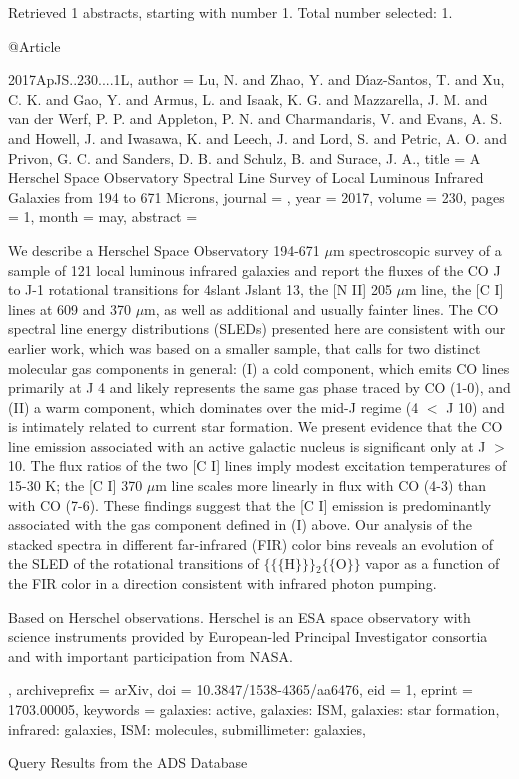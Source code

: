 \documentclass[longauth]{aa}
\begin{document}
{{{{{{{Retrieved 1 abstracts, starting with number 1.  Total number selected: 1.

@Article{2017ApJS..230....1L,
  author        = {Lu, N. and Zhao, Y. and D{\'{\i}}az-Santos, T. and Xu, C. K. and Gao, Y. and Armus, L. and Isaak, K. G. and Mazzarella, J. M. and van der Werf, P. P. and Appleton, P. N. and Charmandaris, V. and Evans, A. S. and Howell, J. and Iwasawa, K. and Leech, J. and Lord, S. and Petric, A. O. and Privon, G. C. and Sanders, D. B. and Schulz, B. and Surace, J. A.},
  title         = {A Herschel Space Observatory Spectral Line Survey of Local Luminous Infrared Galaxies from 194 to 671 Microns},
  journal       = {\apjs},
  year          = {2017},
  volume        = {230},
  pages         = {1},
  month         = may,
  abstract      = {We describe a Herschel Space Observatory 194-671 {$\mu$}m spectroscopic
survey of a sample of 121 local luminous infrared galaxies and report
the fluxes of the CO J to J-1 rotational transitions for 4{\le}slant
J{\le}slant 13, the [N II] 205 {$\mu$}m line, the [C I] lines at 609 and 370
{$\mu$}m, as well as additional and usually fainter lines. The CO spectral
line energy distributions (SLEDs) presented here are consistent with our
earlier work, which was based on a smaller sample, that calls for two
distinct molecular gas components in general: (I) a cold component,
which emits CO lines primarily at J {\lsim} 4 and likely represents the
same gas phase traced by CO (1-0), and (II) a warm component, which
dominates over the mid-J regime (4 $\lt$ J {\lsim} 10) and is intimately
related to current star formation. We present evidence that the CO line
emission associated with an active galactic nucleus is significant only
at J $\gt$ 10. The flux ratios of the two [C I] lines imply modest
excitation temperatures of 15-30 K; the [C I] 370 {$\mu$}m line scales more
linearly in flux with CO (4-3) than with CO (7-6). These findings
suggest that the [C I] emission is predominantly associated with the gas
component defined in (I) above. Our analysis of the stacked spectra in
different far-infrared (FIR) color bins reveals an evolution of the SLED
of the rotational transitions of $\{$$\{$$\{$H$\}$$\}$$\}$$_{2}$$\{$$\{$O$\}$$\}$ vapor as a
function of the FIR color in a direction consistent with infrared photon
pumping.

Based on Herschel observations. Herschel is an ESA space observatory
with science instruments provided by European-led Principal Investigator
consortia and with important participation from NASA.
},
  archiveprefix = {arXiv},
  doi           = {10.3847/1538-4365/aa6476},
  eid           = {1},
  eprint        = {1703.00005},
  keywords      = {galaxies: active, galaxies: ISM, galaxies: star formation, infrared: galaxies, ISM: molecules, submillimeter: galaxies},
}
Query Results from the ADS Database


}}}}}}}
\end{document}
